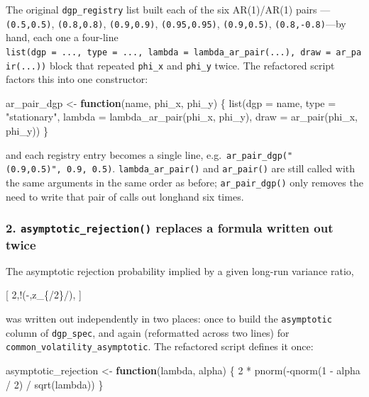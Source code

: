 \documentclass[
  letterpaper,
  DIV=11,
  numbers=noendperiod]{scrartcl}
\newenvironment{Shaded}{\begin{snugshade}}{\end{snugshade}}
\newcommand{\AttributeTok}[1]{\textcolor[rgb]{0.40,0.45,0.13}{#1}}
\newcommand{\ControlFlowTok}[1]{\textcolor[rgb]{0.00,0.23,0.31}{\textbf{#1}}}
\newcommand{\DecValTok}[1]{\textcolor[rgb]{0.68,0.00,0.00}{#1}}
\newcommand{\FunctionTok}[1]{\textcolor[rgb]{0.28,0.35,0.67}{#1}}
\newcommand{\NormalTok}[1]{\textcolor[rgb]{0.00,0.23,0.31}{#1}}
\newcommand{\OtherTok}[1]{\textcolor[rgb]{0.00,0.23,0.31}{#1}}
\newcommand{\SpecialCharTok}[1]{\textcolor[rgb]{0.37,0.37,0.37}{#1}}
\newcommand{\StringTok}[1]{\textcolor[rgb]{0.13,0.47,0.30}{#1}}
\begin{document}
The original \texttt{dgp\_registry} list built each of the six
AR(1)/AR(1) pairs ---\texttt{(0.5,0.5)}, \texttt{(0.8,0.8)},
\texttt{(0.9,0.9)}, \texttt{(0.95,0.95)}, \texttt{(0.9,0.5)},
\texttt{(0.8,-0.8)}---by hand, each one a four-line
\texttt{list(dgp\ =\ ...,\ type\ =\ ...,\ lambda\ =\ lambda\_ar\_pair(...),\ draw\ =\ ar\_pair(...))}
block that repeated \texttt{phi\_x} and \texttt{phi\_y} twice. The
refactored script factors this into one constructor:

\begin{Shaded}
\begin{Highlighting}[]
\NormalTok{ar\_pair\_dgp }\OtherTok{\textless{}{-}} \ControlFlowTok{function}\NormalTok{(name, phi\_x, phi\_y) \{}
  \FunctionTok{list}\NormalTok{(}\AttributeTok{dgp =}\NormalTok{ name, }\AttributeTok{type =} \StringTok{"stationary"}\NormalTok{,}
       \AttributeTok{lambda =} \FunctionTok{lambda\_ar\_pair}\NormalTok{(phi\_x, phi\_y),}
       \AttributeTok{draw =} \FunctionTok{ar\_pair}\NormalTok{(phi\_x, phi\_y))}
\NormalTok{\}}
\end{Highlighting}
\end{Shaded}

and each registry entry becomes a single line,
e.g.~\texttt{ar\_pair\_dgp("(0.9,0.5)",\ 0.9,\ 0.5)}.
\texttt{lambda\_ar\_pair()} and \texttt{ar\_pair()} are still called
with the same arguments in the same order as before;
\texttt{ar\_pair\_dgp()} only removes the need to write that pair of
calls out longhand six times.

\subsubsection{\texorpdfstring{2. \texttt{asymptotic\_rejection()}
replaces a formula written out
twice}{2. asymptotic\_rejection() replaces a formula written out twice}}\label{asymptotic_rejection-replaces-a-formula-written-out-twice}

The asymptotic rejection probability implied by a given long-run
variance ratio,

{[} 2,\Phi!\left(-,z\_\{\alpha/2\}/\sqrt{\lambda}\right), {]}

was written out independently in two places: once to build the
\texttt{asymptotic} column of \texttt{dgp\_spec}, and again (reformatted
across two lines) for \texttt{common\_volatility\_asymptotic}. The
refactored script defines it once:

\begin{Shaded}
\begin{Highlighting}[]
\NormalTok{asymptotic\_rejection }\OtherTok{\textless{}{-}} \ControlFlowTok{function}\NormalTok{(lambda, alpha) \{}
  \DecValTok{2} \SpecialCharTok{*} \FunctionTok{pnorm}\NormalTok{(}\SpecialCharTok{{-}}\FunctionTok{qnorm}\NormalTok{(}\DecValTok{1} \SpecialCharTok{{-}}\NormalTok{ alpha }\SpecialCharTok{/} \DecValTok{2}\NormalTok{) }\SpecialCharTok{/} \FunctionTok{sqrt}\NormalTok{(lambda))}
\NormalTok{\}}
\end{Highlighting}
\end{Shaded}
\end{document}
